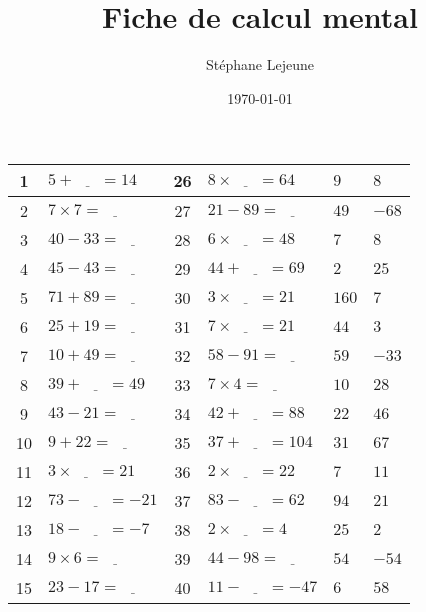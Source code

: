 \documentclass[french,a4paper,10pt]{article}
\title{\hspace{-2.0cm}\color{astral} \sffamily \bfseries Fiche de calcul mental}
\author{\hspace{-2.0cm}Stéphane Lejeune}
\date{\hspace{-2.0cm}\today}
\begin{document}
\maketitle
\noindent
\renewcommand{\arraystretch}{1.6}
\center
\begin{tabular}{|c|p{4cm}|c|p{4cm}||p{1cm}|p{1cm}|}
\hline
1 & $5 + \underline{\phantom{999}} = 14$ & 26 & $8 \times \underline{\phantom{999}} = 64$ & $9$ & $8$ \\
\hline
2 & $7 \times 7 = \underline{\phantom{999}}$ & 27 & $21 - 89 = \underline{\phantom{999}}$ & $49$ & $-68$ \\
\hline
3 & $40 - 33 = \underline{\phantom{999}}$ & 28 & $6 \times \underline{\phantom{999}} = 48$ & $7$ & $8$ \\
\hline
4 & $45 - 43 = \underline{\phantom{999}}$ & 29 & $44 + \underline{\phantom{999}} = 69$ & $2$ & $25$ \\
\hline
5 & $71 + 89 = \underline{\phantom{999}}$ & 30 & $3 \times \underline{\phantom{999}} = 21$ & $160$ & $7$ \\
\hline
6 & $25 + 19 = \underline{\phantom{999}}$ & 31 & $7 \times \underline{\phantom{999}} = 21$ & $44$ & $3$ \\
\hline
7 & $10 + 49 = \underline{\phantom{999}}$ & 32 & $58 - 91 = \underline{\phantom{999}}$ & $59$ & $-33$ \\
\hline
8 & $39 + \underline{\phantom{999}} = 49$ & 33 & $7 \times 4 = \underline{\phantom{999}}$ & $10$ & $28$ \\
\hline
9 & $43 - 21 = \underline{\phantom{999}}$ & 34 & $42 + \underline{\phantom{999}} = 88$ & $22$ & $46$ \\
\hline
10 & $9 + 22 = \underline{\phantom{999}}$ & 35 & $37 + \underline{\phantom{999}} = 104$ & $31$ & $67$ \\
\hline
11 & $3 \times \underline{\phantom{999}} = 21$ & 36 & $2 \times \underline{\phantom{999}} = 22$ & $7$ & $11$ \\
\hline
12 & $73 - \underline{\phantom{999}} = -21$ & 37 & $83 - \underline{\phantom{999}} = 62$ & $94$ & $21$ \\
\hline
13 & $18 - \underline{\phantom{999}} = -7$ & 38 & $2 \times \underline{\phantom{999}} = 4$ & $25$ & $2$ \\
\hline
14 & $9 \times 6 = \underline{\phantom{999}}$ & 39 & $44 - 98 = \underline{\phantom{999}}$ & $54$ & $-54$ \\
\hline
15 & $23 - 17 = \underline{\phantom{999}}$ & 40 & $11 - \underline{\phantom{999}} = -47$ & $6$ & $58$ \\

\end{tabular}
\end{document}
